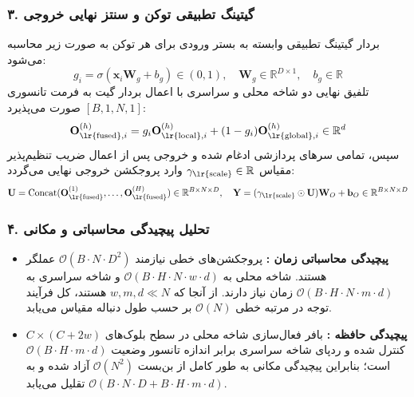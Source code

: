 \subsubsection*{۳. گیتینگ تطبیقی توکن و سنتز نهایی خروجی}
بردار گیتینگ تطبیقی وابسته به بستر ورودی برای هر توکن به صورت زیر محاسبه می‌شود:
\begin{equation}
g_i = \sigma(\mathbf{x}_i \mathbf{W}_g + b_g) \in (0, 1), \quad \mathbf{W}_g \in \mathbb{R}^{D \times 1}, \quad b_g \in \mathbb{R}
\end{equation}
تلفیق نهایی دو شاخه محلی و سراسری با اعمال بردار گیت به فرمت تانسوری $[B, 1, N, 1]$ صورت می‌پذیرد:
\begin{equation}
\mathbf{O}_{\text{\lr{fused}}, i}^{(h)} = g_i \mathbf{O}_{\text{\lr{local}}, i}^{(h)} + (1 - g_i) \mathbf{O}_{\text{\lr{global}}, i}^{(h)} \in \mathbb{R}^d
\end{equation}
سپس، تمامی سرهای پردازشی ادغام شده و خروجی پس از اعمال ضریب تنظیم‌پذیر مقیاس $\gamma_{\text{\lr{scale}}} \in \mathbb{R}$ وارد پروجکشن خروجی نهایی می‌گردد:
\begin{equation}
\mathbf{U} = \operatorname{Concat}(\mathbf{O}_{\text{\lr{fused}}}^{(1)}, \dots, \mathbf{O}_{\text{\lr{fused}}}^{(H)}) \in \mathbb{R}^{B \times N \times D}, \quad \mathbf{Y} = (\gamma_{\text{\lr{scale}}} \odot \mathbf{U})\mathbf{W}_O + \mathbf{b}_O \in \mathbb{R}^{B \times N \times D}
\end{equation}

\subsubsection*{۴. تحلیل پیچیدگی محاسباتی و مکانی}
\begin{itemize}
    \item \textbf{پیچیدگی محاسباتی زمان :} پروجکشن‌های خطی نیازمند $\mathcal{O}(B \cdot N \cdot D^2)$ عملگر هستند. شاخه محلی به $\mathcal{O}(B \cdot H \cdot N \cdot w \cdot d)$ و شاخه سراسری  به $\mathcal{O}(B \cdot H \cdot N \cdot m \cdot d)$ زمان نیاز دارند. از آنجا که $w, m, d \ll N$ هستند، کل فرآیند توجه در مرتبه خطی $\mathcal{O}(N)$ بر حسب طول دنباله مقیاس می‌یابد.
    \item \textbf{پیچیدگی حافظه :} بافر فعال‌سازی شاخه محلی در سطح بلوک‌های $C \times (C + 2w)$ کنترل شده و ردپای شاخه سراسری برابر اندازه تانسور وضعیت $\mathcal{O}(B \cdot H \cdot m \cdot d)$ است؛ بنابراین پیچیدگی مکانی به طور کامل از بن‌بست $\mathcal{O}(N^2)$ آزاد شده و به $\mathcal{O}(B \cdot N \cdot D + B \cdot H \cdot m \cdot d)$ تقلیل می‌یابد.
\end{itemize}

